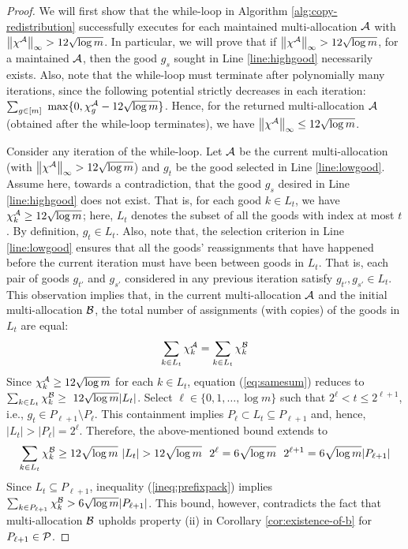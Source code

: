 \begin{proof}
We will first show that the while-loop in Algorithm \ref{alg:copy-redistribution} successfully executes for each maintained multi-allocation $\mathcal{A}$ with $\left\|\chi^{\mathcal{A}}\right\|_\infty > 12 \sqrt{\log m}$. In particular, we will prove that if $\left\|\chi^{\mathcal{A}}\right\|_\infty > 12 \sqrt{\log m}$, for a maintained $\mathcal{A}$, then the good $g_s$ sought in Line \ref{line:highgood} necessarily exists. Also, note that the while-loop must terminate after polynomially many iterations, since the following potential strictly decreases in each iteration: $\sum_{g \in [m]} \ \max\{ 0, \chi^{\mathcal{A}}_g - 12 \sqrt{\log m}\}$. Hence, for the returned multi-allocation $\mathcal{A}$ (obtained after the while-loop terminates), we have $\left\|\chi^{\mathcal{A}}\right\|_\infty \leq 12 \sqrt{\log m}$. 


Consider any iteration of the while-loop. Let $\mathcal{A}$ be the current multi-allocation (with $\left\|\chi^{\mathcal{A}}\right\|_\infty > 12 \sqrt{\log m}$) and $g_t$ be the good selected in Line \ref{line:lowgood}. Assume here, towards a contradiction, that the good $g_s$ desired in Line \ref{line:highgood} does not exist. That is, for each good $k \in L_t$, we have $\chi^{\mathcal{A}}_k \geq 12 \sqrt{\log m}$; here, $L_t$ denotes the subset of all the goods with index at most $t$. %
By definition, $g_t \in L_t$. Also, note that, the selection criterion in Line \ref{line:lowgood} ensures that all the goods' reassignments that have happened before the current iteration must have been between goods in $L_t$. That is, each pair of goods $g_{t'}$ and $g_{s'}$ considered in any previous iteration satisfy $g_{t'}, g_{s'} \in L_t$. This observation implies that, in the current multi-allocation $\mathcal{A}$ and the initial multi-allocation $\mathcal{B}$, the total number of assignments (with copies) of the goods in $L_t$ are equal:  
\begin{align}
    \sum_{k \in L_t} \chi^{\mathcal{A}}_k = \sum_{k \in L_t} \chi^{\mathcal{B}}_k \label{eq:samesum}
\end{align} 
Since $\chi^{\mathcal{A}}_k \geq 12 \sqrt{\log m}$ for each $k \in L_t$, equation (\ref{eq:samesum}) reduces to $\sum_{k \in L_t} \chi^\calB_k \geq  \ 12  \sqrt{\log m} |L_t| $. Select $\ell \in \{0,1,\ldots, \log m\}$ such that $2^\ell < t \leq 2^{\ell+1}$, i.e., $g_t \in P_{\ell +1} \setminus P_\ell$. This containment implies $P_\ell \subset L_t \subseteq P_{\ell+1}$ and, hence, $|L_t| > |P_\ell| = 2^\ell$. Therefore, the above-mentioned bound extends to 
\begin{align}
    \sum_{k \in L_t} \chi^{\mathcal{B}}_k \geq   12 \sqrt{\log m} \ |L_t| >  12 \sqrt{\log m} \ \  2^\ell =  6 \sqrt{\log m} \ \  2^{\ell+1} = 6 \sqrt{\log m} |P_{\ell+1}| \label{ineq:prefixpack}
\end{align}
Since $L_t \subseteq P_{\ell+1}$, inequality (\ref{ineq:prefixpack}) implies $\sum_{k \in P_{\ell+1}} \chi^{\mathcal{B}}_k >  6 \sqrt{\log m} |P_{\ell+1}| $. This bound, however, contradicts the fact that multi-allocation $\mathcal{B}$ upholds property (ii) in Corollary \ref{cor:existence-of-b} for $P_{\ell + 1} \in \mathcal{P}$. 


\end{proof}
